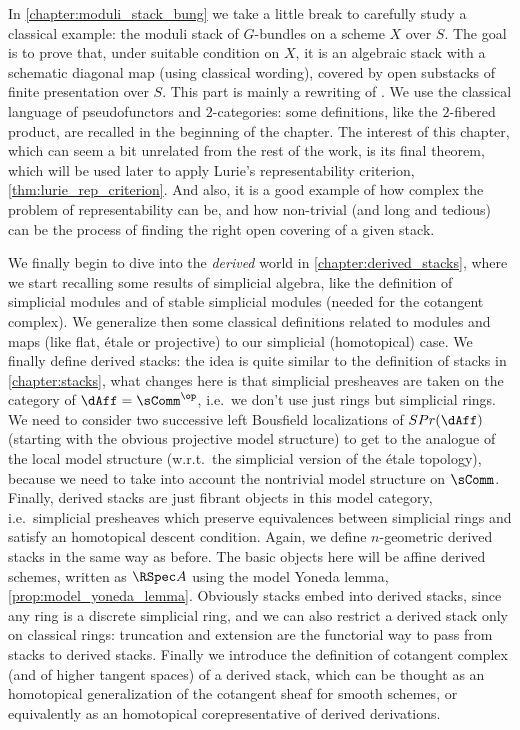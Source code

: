     In \cref{chapter:moduli_stack_bung} we take a little break to carefully study a classical example: the moduli stack of $G$-bundles on a scheme $X$ over $S$. The goal is to prove that, under suitable condition on $X$, it is an algebraic stack with a schematic diagonal map (using classical wording), covered by open substacks of finite presentation over $S$. This part is mainly a rewriting of \cite{wang:moduli}. 
    We use the classical language of pseudofunctors and $2$-categories: some definitions, like the $2$-fibered product, are recalled in the beginning of the chapter. The interest of this chapter, which can seem a bit unrelated from the rest of the work, is its final theorem, which will be used later to apply Lurie's representability criterion, \cref{thm:lurie_rep_criterion}. And also, it is a good example of how complex the problem of representability can be, and how non-trivial (and long and tedious) can be the process of finding the right open covering of a given stack.

    We finally begin to dive into the \emph{derived} world in \cref{chapter:derived_stacks}, where we start recalling some results of simplicial algebra, like the definition of simplicial modules and of stable simplicial modules (needed for the cotangent complex). We generalize then some classical definitions related to modules and maps (like flat, étale or projective) to our simplicial (homotopical) case. We finally define derived stacks: the idea is quite similar to the definition of stacks in \cref{chapter:stacks}, what changes here is that simplicial presheaves are taken on the category of $\dAff = \sComm^{\op}$, i.e.\ we don't use just rings but simplicial rings. We need to consider two successive left Bousfield localizations of $SPr(\dAff)$ (starting with the obvious projective model structure) to get to the analogue of the local model structure (w.r.t.\ the simplicial version of the étale topology), because we need to take into account the nontrivial model structure on $\sComm$. Finally, derived stacks are just fibrant objects in this model category, i.e.\ simplicial presheaves which preserve equivalences between simplicial rings and satisfy an homotopical descent condition. Again, we define $n$-geometric derived stacks in the same way as before. The basic objects here will be affine derived schemes, written as $\RSpec A$ using the model Yoneda lemma, \cref{prop:model_yoneda_lemma}. 
    Obviously stacks embed into derived stacks, since any ring is a discrete simplicial ring, and we can also restrict a derived stack only on classical rings: truncation and extension are the functorial way to pass from stacks to derived stacks. Finally we introduce the definition of cotangent complex (and of higher tangent spaces) of a derived stack, which can be thought as an homotopical generalization of the cotangent sheaf for smooth schemes, or equivalently as an homotopical corepresentative of derived derivations.

